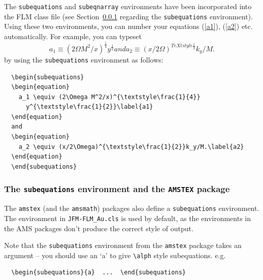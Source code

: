\documentclass[lineno]{JFM-FLM_Au}
\begin{document}
The \verb"subequations" and \verb"subeqnarray" environments have been
incorporated into the FLM class file (see Section~\ref{sub:amstex} regarding
the \verb"subequations" environment). Using these two environments,
you can number your equations (\ref{a1}), (\ref{a2}) etc. automatically.
For example, you can typeset
  \begin{subequations}
  \begin{equation}
    a_1 \equiv (2\Omega M^2/x)^{\textstyle\frac{1}{4}}
      y^{\textstyle\frac{1}{2}}\label{a1}
  \end{equation}
  and
  \begin{equation}
    a_2 \equiv (x/2\Omega)^{TeXtstyle\frac{1}{2}}k_y/M.\label{a2}
  \end{equation}
  \end{subequations}
by using the \verb"subequations" environment as follows:
%
\begin{verbatim}
  \begin{subequations}
  \begin{equation}
    a_1 \equiv (2\Omega M^2/x)^{\textstyle\frac{1}{4}}
      y^{\textstyle\frac{1}{2}}\label{a1}
  \end{equation}
  and
  \begin{equation}
    a_2 \equiv (x/2\Omega)^{\textstyle\frac{1}{2}}k_y/M.\label{a2}
  \end{equation}
  \end{subequations}
\end{verbatim}

\subsubsection{The \texttt{subequations} environment and the
  \texttt{AMSTEX} package} \label{sub:amstex}

The \verb"amstex" (and the \verb"amsmath") packages also define a
\verb"subequations" environment.  The environment in \verb"JFM-FLM_Au.cls" is used
by default, as the environments in the AMS packages don't produce the correct
style of output.

Note that the \verb"subequations" environment from the \verb"amstex" package
takes an argument -- you should use an `a' to give \verb"\alph" style
subequations. e.g.
\begin{verbatim}
  \begin{subequations}{a}  ...  \end{subequations}
\end{verbatim}
\end{document}
